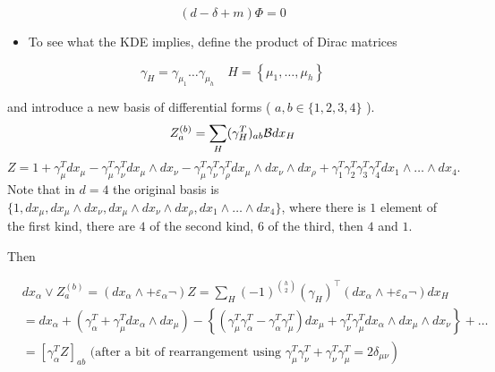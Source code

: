 \begin{equation}
\label{eq:dke}
\boxed{(d-\delta+m) \Phi=0}
\end{equation}

\begin{itemize}
  \item To see what the KDE implies, define the product of Dirac matrices
\end{itemize}

\begin{equation}
\gamma_{H}=\gamma_{\mu_{1}} \ldots \gamma_{\mu_h} \quad H=\left\{\mu_{1}, \ldots, \mu_{h}\right\}
\end{equation}

and introduce a new basis of differential forms ( \(a, b \in\{1,2,3,4\}\) ).
\begin{equation}
    Z_a^{(b)} = \sum_H (\gamma_H^T)_{ab}{\cal B} dx_H
\end{equation}
\begin{equation}
    Z = 1 + \gamma_\mu^T dx_\mu - \gamma_\mu^T \gamma_\nu^T dx_\mu \wedge dx_\nu -\gamma_\mu^T \gamma_\nu^T \gamma_\rho^T dx_\mu \wedge dx_\nu \wedge dx_\rho + \gamma_1^T \gamma_2^T \gamma_3^T \gamma_4^Tdx_1\wedge\ldots\wedge dx_4.
\end{equation}
Note  that in $d=4$ the original basis is $\{1, dx_\mu, dx_\mu \wedge dx_\nu, dx_\mu \wedge dx_\nu \wedge dx_\rho, dx_1 \wedge \ldots \wedge dx_4\}$, where there is $1$ element of the first kind, there are $4$ of the second kind, $6$ of the third, then $4$ and $1$.

Then

\begin{equation}
\begin{aligned}
& d x_{\alpha} \vee Z_{a}^{(b)}=\left(d x_{\alpha} \wedge+\varepsilon_{\alpha} \neg\right) Z=\sum_{H}(-1)^{\binom{h}{2}}\left(\gamma_{H}\right)^{\top}\left(d x_{\alpha} \wedge+\varepsilon_{\alpha} \neg\right) d x_{H} \\
& =d x_{\alpha}+\left(\gamma_{\alpha}^{T}+\gamma_{\mu}^{T} d x_{\alpha} \wedge d x_{\mu}\right)-\left\{\left(\gamma_{\mu}^{T} \gamma_{\alpha}^{T}-\gamma_{\alpha}^{T} \gamma_{\mu}^{T}\right) d x_{\mu}+\gamma_{\nu}^{T} \gamma_{\mu}^{T} d x_{\alpha} \wedge d x_{\mu} \wedge d x_{\nu}\right\}+\ldots \\
& \left.=\left[\gamma_{\alpha}^{T} Z\right]_{a b} \text { (after a bit of rearrangement using } \gamma_{\mu}^{T} \gamma_{\nu}^{T}+\gamma_{\nu}^{T} \gamma_{\mu}^{T}=2 \delta_{\mu \nu}\right)
\end{aligned}
\end{equation}

